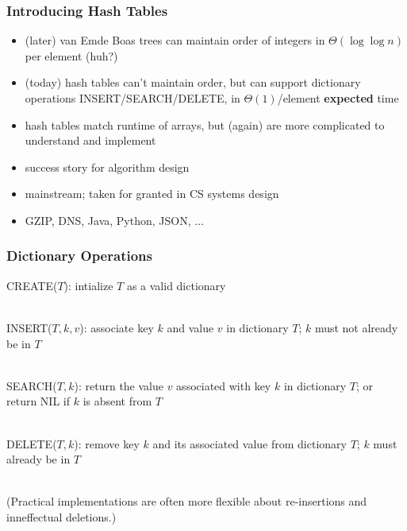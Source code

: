 \documentclass{beamer}
\newcommand{\stanza}{ \\~\ }
\begin{document}
\begin{frame} \frametitle{Introducing Hash Tables}
\begin{itemize}
  \item (later) van Emde Boas trees can maintain order of integers in
    $\Theta(\log \log n)$ per element (huh?)
  \item (today) hash tables can't maintain order, but can support dictionary
    operations INSERT/SEARCH/DELETE, in $\Theta(1)$/element \textbf{expected} time
  \item hash tables match runtime of arrays, but (again) are more complicated
    to understand and implement
  \item success story for algorithm design
  \item mainstream; taken for granted in CS systems design
  \item GZIP, DNS, Java, Python, JSON, $\ldots$
\end{itemize}
\end{frame}

\begin{frame} \frametitle{Dictionary Operations}
CREATE($T$): intialize $T$ as a valid dictionary \stanza

INSERT($T, k, v$): associate key $k$ and value $v$ in dictionary $T$;
$k$ must not already be in $T$ \stanza

SEARCH($T, k$): return the value $v$ associated with key $k$ in dictionary $T$;
or return NIL if $k$ is absent from $T$ \stanza

DELETE($T, k$): remove key $k$ and its associated value from dictionary $T$;
$k$ must already be in $T$ \stanza

(Practical implementations are often more flexible about re-insertions and
inneffectual deletions.)
\end{frame}
\end{document}
